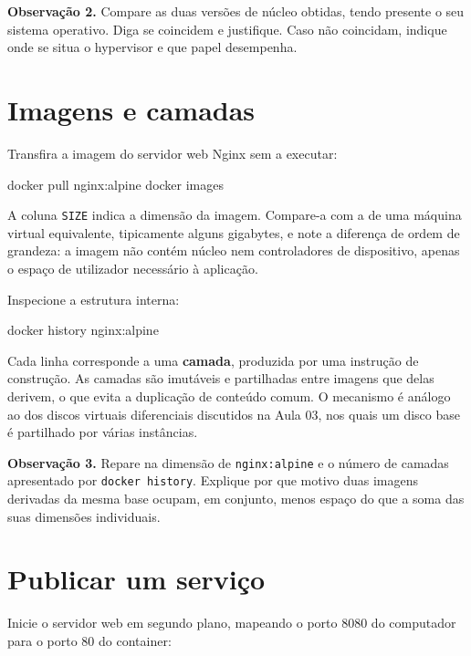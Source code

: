 \documentclass[11pt,a4paper]{article}
\begin{document}
\begin{registo}
\textbf{Observação 2.} Compare as duas versões de núcleo obtidas, tendo presente o seu sistema operativo. Diga se coincidem e justifique. Caso não coincidam, indique onde se situa o hypervisor e que papel desempenha.
\end{registo}

\section{Imagens e camadas}

Transfira a imagem do servidor web Nginx sem a executar:

\begin{terminal}
docker pull nginx:alpine
docker images
\end{terminal}

A coluna \texttt{SIZE} indica a dimensão da imagem. Compare-a com a de uma máquina virtual equivalente, tipicamente alguns gigabytes, e note a diferença de ordem de grandeza: a imagem não contém núcleo nem controladores de dispositivo, apenas o espaço de utilizador necessário à aplicação.

Inspecione a estrutura interna:

\begin{terminal}
docker history nginx:alpine
\end{terminal}

Cada linha corresponde a uma \textbf{camada}, produzida por uma instrução de construção. As camadas são imutáveis e partilhadas entre imagens que delas derivem, o que evita a duplicação de conteúdo comum. O mecanismo é análogo ao dos discos virtuais diferenciais discutidos na Aula 03, nos quais um disco base é partilhado por várias instâncias.

\begin{registo}
\textbf{Observação 3.} Repare na dimensão de \texttt{nginx:alpine} e o número de camadas apresentado por \texttt{docker history}. Explique por que motivo duas imagens derivadas da mesma base ocupam, em conjunto, menos espaço do que a soma das suas dimensões individuais.
\end{registo}

\section{Publicar um serviço}

Inicie o servidor web em segundo plano, mapeando o porto 8080 do computador para o porto 80 do container:
\end{document}
